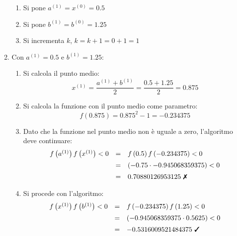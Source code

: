 \documentclass[a4paper]{article}
\begin{document}
\begin{examplebox}
\begin{enumerate}
\begin{enumerate}
                \item Si pone $a^{(1)} = x^{(0)} = 0.5$

                \item Si pone $b^{(1)} = b^{(0)} = 1.25$

                \item Si incrementa $k$, $k = k + 1 = 0 + 1 = 1$
            \end{enumerate}

            \item Con $a^{(1)} = 0.5$ e $b^{(1)} = 1.25$:
            \begin{enumerate}
                \item Si calcola il punto medio:
                \begin{equation*}
                    x^{(1)} = \dfrac{a^{(1)} + b^{(1)}}{2} = \dfrac{0.5 + 1.25}{2} = 0.875
                \end{equation*}

                \item Si calcola la funzione con il punto medio come parametro:
                \begin{equation*}
                    f\left(0.875\right) = 0.875^{2} - 1 = -0.234375
                \end{equation*}

                \item Dato che la funzione nel punto medio non è uguale a zero, l'algoritmo deve continuare:
                \begin{equation*}
                    \begin{array}{rcl}
                        f\left(a^{(1)}\right)f\left(x^{(1)}\right) < 0 &=& f\left(0.5\right)f\left(-0.234375\right) < 0 \\ [.5em]
                        &=& \left(-0.75 \cdot -0.945068359375\right) < 0 \\ [.5em]
                        &=& 0.70880126953125 \text{ \ding{55}}
                    \end{array}
                \end{equation*}
                
                \item Si procede con l'algoritmo:
                \begin{equation*}
                    \begin{array}{rcl}
                        f\left(x^{(1)}\right)f\left(b^{(1)}\right) < 0 &=& f\left(-0.234375\right)f\left(1.25\right) < 0 \\ [.5em]
                        &=& \left(-0.945068359375 \cdot 0.5625\right) < 0 \\ [.5em]
                        &=& -0.5316009521484375 \text{ \ding{51}}
                    \end{array}
                \end{equation*}


\end{enumerate}
\end{enumerate}
\end{examplebox}
\end{document}
